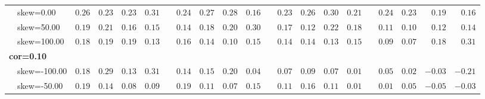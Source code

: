 \begin{table}[!tbp]
\begin{center}
\begin{tabular}{lrrrrcrrrrcrrrrcrrrr}
   ~~skew=0.00&\cellcolor[gray]{0.47}   $0.26$&\cellcolor[gray]{0.47}   $0.23$&\cellcolor[gray]{0.47}   $0.23$&\cellcolor[gray]{0.47}   $0.31$&   &\cellcolor[gray]{0.47}   $0.24$&\cellcolor[gray]{0.47}   $0.27$&\cellcolor[gray]{0.47}   $0.28$&\cellcolor[gray]{0.73}   $0.16$&   &\cellcolor[gray]{0.47}   $0.23$&\cellcolor[gray]{0.47}   $0.26$&\cellcolor[gray]{0.47}   $ 0.30$&\cellcolor[gray]{0.47}   $ 0.21$&   &\cellcolor[gray]{0.47}   $0.24$&\cellcolor[gray]{0.47}   $0.23$&\cellcolor[gray]{0.73}   $ 0.19$&\cellcolor[gray]{0.73}   $ 0.16$\tabularnewline
   ~~skew=50.00&\cellcolor[gray]{0.73}   $0.19$&\cellcolor[gray]{0.47}   $0.21$&\cellcolor[gray]{0.73}   $0.16$&\cellcolor[gray]{0.73}   $0.15$&   &\cellcolor[gray]{0.73}   $0.14$&\cellcolor[gray]{0.73}   $0.18$&\cellcolor[gray]{0.73}   $0.20$&\cellcolor[gray]{0.47}   $0.30$&   &\cellcolor[gray]{0.73}   $0.17$&\cellcolor[gray]{0.73}   $0.12$&\cellcolor[gray]{0.47}   $ 0.22$&\cellcolor[gray]{0.73}   $ 0.18$&   &\cellcolor[gray]{0.73}   $0.11$&\cellcolor[gray]{1}   $0.10$&\cellcolor[gray]{0.73}   $ 0.12$&\cellcolor[gray]{0.73}   $ 0.14$\tabularnewline
   ~~skew=100.00&\cellcolor[gray]{0.73}   $0.18$&\cellcolor[gray]{0.73}   $0.19$&\cellcolor[gray]{0.73}   $0.19$&\cellcolor[gray]{0.73}   $0.13$&   &\cellcolor[gray]{0.73}   $0.16$&\cellcolor[gray]{0.73}   $0.14$&\cellcolor[gray]{1}   $0.10$&\cellcolor[gray]{0.73}   $0.15$&   &\cellcolor[gray]{0.73}   $0.14$&\cellcolor[gray]{0.73}   $0.14$&\cellcolor[gray]{0.73}   $ 0.13$&\cellcolor[gray]{0.73}   $ 0.15$&   &\cellcolor[gray]{1}   $0.09$&\cellcolor[gray]{1}   $0.07$&\cellcolor[gray]{0.73}   $ 0.18$&\cellcolor[gray]{0.47}   $ 0.31$\tabularnewline
\hline
{\bfseries cor=0.10}&&&&&&&&&&&&&&&&&&&\tabularnewline
   ~~skew=-100.00&\cellcolor[gray]{0.73}   $0.18$&\cellcolor[gray]{0.47}   $0.29$&\cellcolor[gray]{0.73}   $0.13$&\cellcolor[gray]{0.2}   $0.31$&   &\cellcolor[gray]{0.73}   $0.14$&\cellcolor[gray]{0.73}   $0.15$&\cellcolor[gray]{0.73}   $0.20$&\cellcolor[gray]{1}   $0.04$&   &\cellcolor[gray]{1}   $0.07$&\cellcolor[gray]{1}   $0.09$&\cellcolor[gray]{1}   $ 0.07$&\cellcolor[gray]{1}   $ 0.01$&   &\cellcolor[gray]{1}   $0.05$&\cellcolor[gray]{1}   $0.02$&\cellcolor[gray]{1}   $-0.03$&\cellcolor[gray]{0.73}   $-0.21$\tabularnewline
   ~~skew=-50.00&\cellcolor[gray]{0.73}   $0.19$&\cellcolor[gray]{0.73}   $0.14$&\cellcolor[gray]{1}   $0.08$&\cellcolor[gray]{1}   $0.09$&   &\cellcolor[gray]{0.73}   $0.19$&\cellcolor[gray]{0.73}   $0.11$&\cellcolor[gray]{1}   $0.07$&\cellcolor[gray]{0.73}   $0.15$&   &\cellcolor[gray]{0.73}   $0.11$&\cellcolor[gray]{0.73}   $0.16$&\cellcolor[gray]{0.73}   $ 0.11$&\cellcolor[gray]{1}   $ 0.01$&   &\cellcolor[gray]{1}   $0.01$&\cellcolor[gray]{1}   $0.05$&\cellcolor[gray]{1}   $-0.05$&\cellcolor[gray]{1}   $-0.03$\tabularnewline

\end{tabular}
\end{center}
\end{table}
